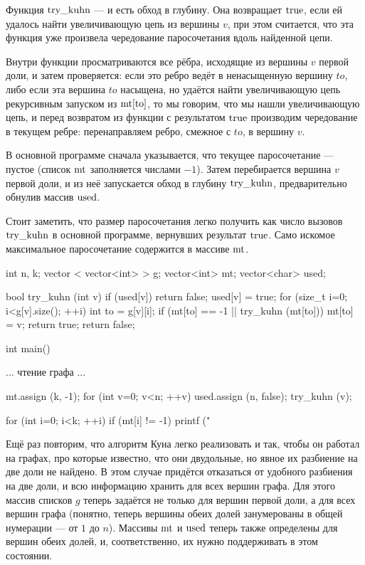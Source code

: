 Функция $\rm try\_kuhn$ --- и есть обход в глубину. Она возвращает $\rm true$, если ей удалось найти увеличивающую цепь из вершины $v$, при этом считается, что эта функция уже произвела чередование паросочетания вдоль найденной цепи.

Внутри функции просматриваются все рёбра, исходящие из вершины $v$ первой доли, и затем проверяется: если это ребро ведёт в ненасыщенную вершину $to$, либо если эта вершина $to$ насыщена, но удаётся найти увеличивающую цепь рекурсивным запуском из $\rm mt[to]$, то мы говорим, что мы нашли увеличивающую цепь, и перед возвратом из функции с результатом $\rm true$ производим чередование в текущем ребре: перенаправляем ребро, смежное с $to$, в вершину $v$.

В основной программе сначала указывается, что текущее паросочетание --- пустое (список $\rm mt$ заполняется числами $-1$). Затем перебирается вершина $v$ первой доли, и из неё запускается обход в глубину $\rm try\_kuhn$, предварительно обнулив массив $\rm used$.

Стоит заметить, что размер паросочетания легко получить как число вызовов $\rm try\_kuhn$ в основной программе, вернувших результат $\rm true$. Само искомое максимальное паросочетание содержится в массиве $\rm mt$.

\code
int n, k;
vector < vector<int> > g;
vector<int> mt;
vector<char> used;

bool try_kuhn (int v) {
	if (used[v])  return false;
	used[v] = true;
	for (size_t i=0; i<g[v].size(); ++i) {
		int to = g[v][i];
		if (mt[to] == -1 || try_kuhn (mt[to])) {
			mt[to] = v;
			return true;
		}
	}
	return false;
}

int main() {
	... чтение графа ...

	mt.assign (k, -1);
	for (int v=0; v<n; ++v) {
		used.assign (n, false);
		try_kuhn (v);
	}

	for (int i=0; i<k; ++i)
		if (mt[i] != -1)
			printf ("%
}
\endcode

Ещё раз повторим, что алгоритм Куна легко реализовать и так, чтобы он работал на графах, про которые известно, что они двудольные, но явное их разбиение на две доли не найдено. В этом случае придётся отказаться от удобного разбиения на две доли, и всю информацию хранить для всех вершин графа. Для этого массив списков $g$ теперь задаётся не только для вершин первой доли, а для всех вершин графа (понятно, теперь вершины обеих долей занумерованы в общей нумерации --- от $1$ до $n$). Массивы $\rm mt$ и $\rm used$ теперь также определены для вершин обеих долей, и, соответственно, их нужно поддерживать в этом состоянии.


